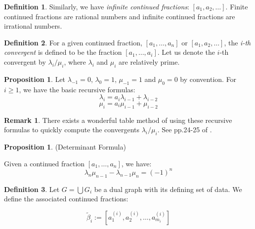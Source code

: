 \documentclass[11pt]{amsart}
\theoremstyle{definition}
\newtheorem{prop}[thm]{Proposition}
\newtheorem*{defin}{Definition}
\newtheorem*{rem}{Remark}
\begin{document}
{\begin{defin}
Similarly, we have {\it infinite continued fractions}: $\displaystyle [a_1, a_2, \ldots]$. Finite continued fractions are rational numbers and infinite continued fractions are irrational numbers.
\end{defin}

\begin{defin}
For a given continued fraction, $\displaystyle [a_1, \ldots, a_n]$ or $\displaystyle [a_1, a_2, \ldots]$, the {\it i-th convergent} is defined to be the fraction $\displaystyle [a_1, \ldots, a_i]$. Let us denote the $i$-th convergent by $\displaystyle \lambda_i/\mu_i$, where $\lambda_i$ and $\mu_i$ are relatively prime.
\end{defin}

\begin{prop} \label{conrec}
Let $\displaystyle \lambda_{-1}=0$, $\displaystyle \lambda_0=1$, $\displaystyle \mu_{-1}=1$ and $\displaystyle \mu_0=0$ by convention. For $i\geq 1$, we have the basic recursive formulas:
\begin{equation*}
\lambda_i=a_{i}\lambda_{i-1}+\lambda_{i-2}
\end{equation*}
\begin{equation*}
\mu_i=a_{i}\mu_{i-1}+\mu_{i-2}
\end{equation*}
\end{prop}

\begin{rem}
There exists a wonderful table method of using these recursive formulas to quickly compute the convergents $\lambda_i/\mu_i$. See pp.24-25 of \cite{olds}.
\end{rem}

\begin{prop} \label{condet} (Determinant Formula)

Given a continued fraction $\displaystyle [a_1, \ldots, a_n]$, we have:
\begin{equation*}
\lambda_n\mu_{n-1}-\lambda_{n-1}\mu_n = (-1)^{n}
\end{equation*}
\end{prop}


\begin{defin}
Let $\displaystyle G=\bigcup G_i$ be a dual graph with its defining set of data. We define the associated continued fractions:

\begin{equation*}
\tilde \beta_i := \left[a_1^{(i)}, a_2^{(i)}, \ldots, a_{m_i}^{(i)}\right]
\end{equation*}


\end{defin}}
\end{document}
